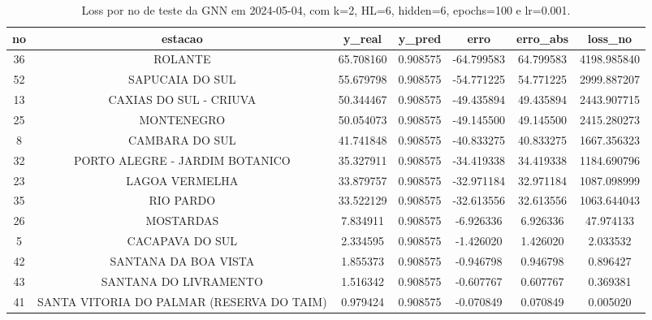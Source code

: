 \begin{table}[h]
\centering
\caption{Loss por no de teste da GNN em 2024-05-04, com k=2, HL=6, hidden=6, epochs=100 e lr=0.001.}
\label{tab:gnn_loss_k2_hl6_h6_e100_d20240504}
\begin{tabular}{ccccccc}
\toprule
no & estacao & y\_real & y\_pred & erro & erro\_abs & loss\_no \\
\midrule
36 & ROLANTE & 65.708160 & 0.908575 & -64.799583 & 64.799583 & 4198.985840 \\
52 & SAPUCAIA DO SUL & 55.679798 & 0.908575 & -54.771225 & 54.771225 & 2999.887207 \\
13 & CAXIAS DO SUL - CRIUVA & 50.344467 & 0.908575 & -49.435894 & 49.435894 & 2443.907715 \\
25 & MONTENEGRO & 50.054073 & 0.908575 & -49.145500 & 49.145500 & 2415.280273 \\
8 & CAMBARA DO SUL & 41.741848 & 0.908575 & -40.833275 & 40.833275 & 1667.356323 \\
32 & PORTO ALEGRE - JARDIM BOTANICO & 35.327911 & 0.908575 & -34.419338 & 34.419338 & 1184.690796 \\
23 & LAGOA VERMELHA & 33.879757 & 0.908575 & -32.971184 & 32.971184 & 1087.098999 \\
35 & RIO PARDO & 33.522129 & 0.908575 & -32.613556 & 32.613556 & 1063.644043 \\
26 & MOSTARDAS & 7.834911 & 0.908575 & -6.926336 & 6.926336 & 47.974133 \\
5 & CACAPAVA DO SUL & 2.334595 & 0.908575 & -1.426020 & 1.426020 & 2.033532 \\
42 & SANTANA DA BOA VISTA & 1.855373 & 0.908575 & -0.946798 & 0.946798 & 0.896427 \\
43 & SANTANA DO LIVRAMENTO & 1.516342 & 0.908575 & -0.607767 & 0.607767 & 0.369381 \\
41 & SANTA VITORIA DO PALMAR (RESERVA DO TAIM) & 0.979424 & 0.908575 & -0.070849 & 0.070849 & 0.005020 \\
\bottomrule
\end{tabular}
\end{table}

